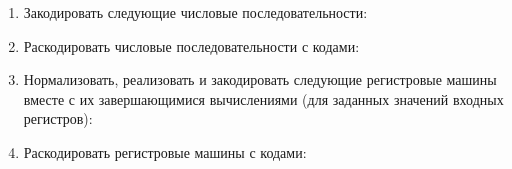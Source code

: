 \documentclass[12pt,a4paper]{article}
\newcommand{\monus}{\stackrel{{}^{\scriptstyle .}}{\smash{-}}}
\begin{document}
\begin{enumerate}[itemsep=3pt]
\item Закодировать следующие числовые последовательности:
  \begin{enumerate}
  \end{enumerate}

\item Раскодировать числовые последовательности с кодами:
  \begin{enumerate}
  \end{enumerate}

\item Нормализовать, реализовать и закодировать следующие регистровые машины 
вместе с их завершающимися вычислениями (для заданных значений входных регистров):
  \begin{enumerate}
  \end{enumerate}

\item Раскодировать регистровые машины с кодами:
  \begin{enumerate}
  \end{enumerate}



\end{enumerate}
\end{document}
